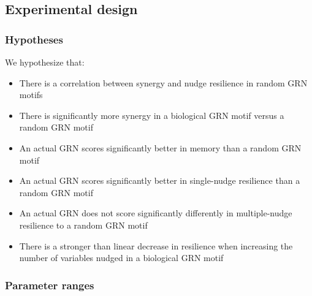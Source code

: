 \documentclass[../main.tex]{subfiles}
\begin{document}
\subsection{Experimental design}

\subsubsection{Hypotheses}

We hypothesize that:

\begin{itemize}
\item There is a correlation between synergy and nudge resilience in random GRN motifs
\item There is significantly more synergy in a biological GRN motif versus a random GRN motif
\item An actual GRN scores significantly better in memory than a random GRN motif
\item An actual GRN scores significantly better in single-nudge resilience than a random GRN motif
\item An actual GRN does not score significantly differently in multiple-nudge resilience to a random GRN motif
\item There is a stronger than linear decrease in resilience when increasing the number of variables nudged in a biological GRN motif
\end{itemize}



\subsubsection{Parameter ranges}
\end{document}
